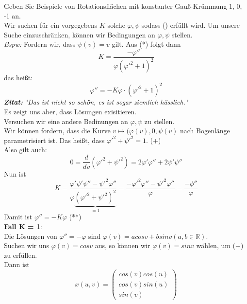 \begin{problem*}[2b]
Geben Sie Beispiele von Rotationsflächen mit konstanter Gauß-Krümmung 1, 0, -1 an.\\
Wir suchen für ein vorgegebens $ K $ solche $\varphi, \psi$ sodass (\*) erfüllt wird. Um unsere Suche einzuschränken, können wir Bedingungen an $\varphi, \psi$ stellen. \\
\emph{Bspw:} Fordern wir, dass $ \psi(v) = v$ gilt. 
Aus (*) folgt dann 
\begin{equation*}
	K = \frac{-\varphi''}{\varphi(\varphi'^2 + 1)^2}
\end{equation*}	
das heißt:
\begin{equation*}
	\varphi'' = -K \varphi \cdot (\varphi'^2 + 1)^2
\end{equation*}	
\emph{\textbf{Zitat:}} \emph{"Das ist nicht so schön, es ist sogar ziemlich hässlich."} \\
Es zeigt uns aber, dass Lösungen exisitieren. \\
Versuchen wir eine andere Bedinungen an $\varphi, \psi $ zu stellen. \\
Wir können fordern, dass die Kurve $v \mapsto (\varphi(v), 0, \psi(v)$ nach Bogenlänge parametrisiert ist. Das heißt, dass $\varphi'^2 + \psi'^2 = 1$. (+)\\
Also gilt auch:
\begin{equation*}
	0 = \frac{d}{dv}(\varphi'^2 + \psi'^2) = 2 \varphi'\varphi'' + 2 \psi' \psi''
\end{equation*}
Nun ist 
\begin{equation*}
	K = \frac{\varphi' \psi' \psi'' - \psi'^2 \varphi''}{\varphi\underbrace{ (\varphi'^2 + \psi'^2)^2}_{ = 1 }} = \frac{-\varphi'^2 \varphi'' - \psi'^2 \varphi''}{\varphi} = \frac{-\phi''}{\varphi}
\end{equation*}
Damit ist $\varphi'' = -K \varphi$ (**) \\
\textbf{Fall K = 1}:\\
Die Lösungen von $\varphi'' = - \varphi$ sind $\varphi(v) = a cosv + b sinv (a,b \in \mathbb{R})$. \\
Suchen wir uns $\varphi(v) = cos v$ aus, so können wir $ \varphi(v) = sin v$ wählen, um (+) zu erfüllen. \\
Dann ist
\begin{equation*}
	x(u,v) = \begin{pmatrix}
	cos(v) cos(u) \\
	cos(v) sin(u) \\
	sin(v)	
	\end{pmatrix}

\end{equation*}
\end{problem*}
